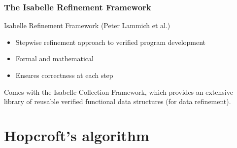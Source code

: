 \documentclass{beamer}
\theoremstyle{definition}
\begin{document}
\begin{frame}
  \frametitle{The Isabelle Refinement Framework}


  \begin{block}{Isabelle Refinement Framework (Peter Lammich et al.)}
    \begin{itemize}
      \item Stepwise refinement approach to verified program development
      \item Formal and mathematical
      \item Ensures correctness at each step
    \end{itemize}
  \end{block}
  Comes with the Isabelle Collection Framework, which provides an extensive library of reusable verified functional data structures (for data refinement).

  \vfill
\end{frame}

\section{Hopcroft's algorithm}

\begin{frame}
    \tableofcontents[currentsection]
\end{frame}
\end{document}
